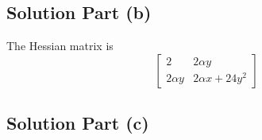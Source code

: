 \subsection*{Solution Part (b)}

The Hessian matrix is
\[ \left[ \begin{matrix}
    2 & 2\alpha y\\
    2\alpha y & 2\alpha x + 24 y^2
\end{matrix} \right] \]

\subsection*{Solution Part (c)}
